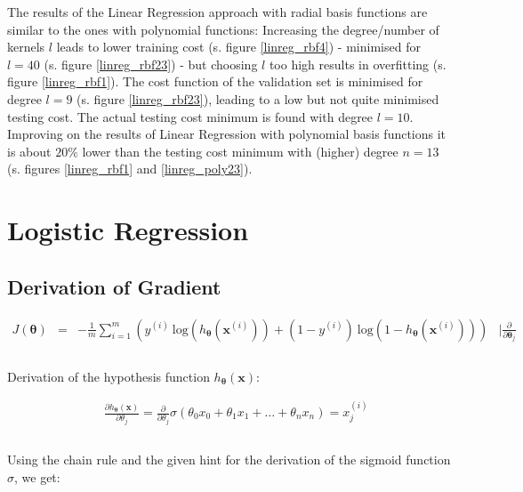 \documentclass{article}
\begin{document}
The results of the Linear Regression approach with radial basis functions are similar to the ones with polynomial functions: Increasing the degree/number of kernels $l$ leads to lower training cost (s. figure \ref{linreg_rbf4}) - minimised for $l=40$ (s. figure \ref{linreg_rbf23}) - but choosing $l$ too high results in overfitting (s. figure \ref{linreg_rbf1}). The cost function of the validation set is minimised for degree $l=9$ (s. figure \ref{linreg_rbf23}), leading to a low but not quite minimised testing cost. The actual testing cost minimum is found with degree $l=10$. Improving on the results of Linear Regression with polynomial basis functions it is about $20\%$ lower than the testing cost minimum with (higher) degree $n=13$ (s. figures \ref{linreg_rbf1} and \ref{linreg_poly23}). 


\clearpage

\section{Logistic Regression}

\subsection{Derivation of Gradient}

$$\begin{array}{rccl}
    J(\boldsymbol{\theta}) & = & - \frac{1}{m	} \displaystyle \sum_{i=1}^{m} \left(y^{(i)} \ \textrm{log}(h_{\boldsymbol{\theta}}(\boldsymbol{x}^{(i)})) + (1 - y^{(i)}) \ \textrm{log} (1 - h_{\boldsymbol{\theta}}(\boldsymbol{x}^{(i)}))\right) & \mid \frac{\partial}{\partial \boldsymbol{\theta}_j} \\\\
\end{array}$$
    
Derivation of the hypothesis function $ h_{\boldsymbol{\theta}}(\boldsymbol{x}) $:\

$$\begin{array}{rccl}  

&&\frac{\partial h_{\boldsymbol{\theta}}(\boldsymbol{x})}{\partial \theta_j} = \frac{\partial}{\partial \theta_j} \sigma(\theta_0 x_0 + \theta_1 x_1 + \dots + \theta_n x_n) = x^{(i)}_j &\\\\
\end{array}$$

Using the chain rule and the given hint for the derivation of the sigmoid function $\sigma$, we get:
\end{document}
